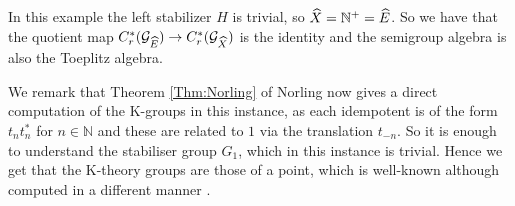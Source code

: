 \begin{example}
In this example the left stabilizer $H$ is trivial, so $\widehat{X} = \mathbb{N}^{+} = \widehat{E}$. So we have that the quotient map $C^{*}_{r}(\mathcal{G}_{\widehat{E}}) \rightarrow C^{*}_{r}(\mathcal{G}_{\widehat{X}})$ is the identity and the semigroup algebra is also the Toeplitz algebra.

We remark that Theorem \ref{Thm:Norling} of Norling now gives a direct computation of the K-groups in this instance, as each idempotent is of the form $t_{n}t_{n}^{*}$ for $n \in \mathbb{N}$ and these are related to $1$ via the translation $t_{-n}$. So it is enough to understand the stabiliser group $G_{1}$, which in this instance is trivial. Hence we get that the K-theory groups are those of a point, which is well-known although computed in a different manner \cite{MR587369,MR2457037}.
\end{example}

